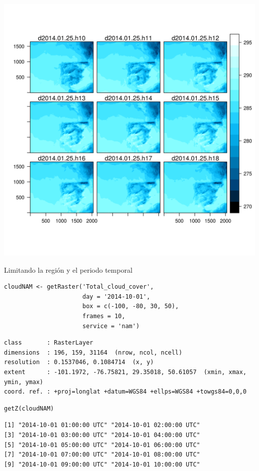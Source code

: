 \documentclass[xcolor={usenames,svgnames,dvipsnames}]{beamer}
\begin{document}
\begin{frame}[label=sec-3-2]{}
\includegraphics[width=.9\linewidth]{figs/wrf.png}
\end{frame}

\begin{frame}[fragile,label=sec-3-3]{Limitando la región y el periodo temporal}
 \lstset{language=R,label= ,caption= ,numbers=none}
\begin{lstlisting}
cloudNAM <- getRaster('Total_cloud_cover',
                      day = '2014-10-01',
                      box = c(-100, -80, 30, 50),
                      frames = 10,
                      service = 'nam')
\end{lstlisting}

\begin{verbatim}
class       : RasterLayer 
dimensions  : 196, 159, 31164  (nrow, ncol, ncell)
resolution  : 0.1537046, 0.1084714  (x, y)
extent      : -101.1972, -76.75821, 29.35018, 50.61057  (xmin, xmax, ymin, ymax)
coord. ref. : +proj=longlat +datum=WGS84 +ellps=WGS84 +towgs84=0,0,0
\end{verbatim}

\lstset{language=R,label= ,caption= ,numbers=none}
\begin{lstlisting}
getZ(cloudNAM)
\end{lstlisting}

\begin{verbatim}
[1] "2014-10-01 01:00:00 UTC" "2014-10-01 02:00:00 UTC"
[3] "2014-10-01 03:00:00 UTC" "2014-10-01 04:00:00 UTC"
[5] "2014-10-01 05:00:00 UTC" "2014-10-01 06:00:00 UTC"
[7] "2014-10-01 07:00:00 UTC" "2014-10-01 08:00:00 UTC"
[9] "2014-10-01 09:00:00 UTC" "2014-10-01 10:00:00 UTC"
\end{verbatim}
\end{frame}
\end{document}
